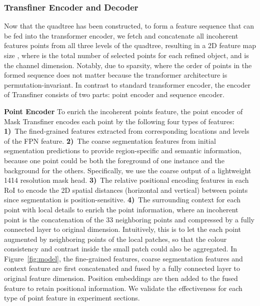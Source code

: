 \documentclass[10pt,twocolumn,letterpaper]{article}
\newcommand{\parsection}[1]{\vspace{1mm}\noindent\textbf{#1}}
\begin{document}
\subsubsection{Transfiner Encoder and Decoder} 
Now that the quadtree has been constructed, to form a feature sequence that can be fed into the transformer encoder, we fetch and concatenate all incoherent features points from all three levels of the quadtree, resulting in a 2D feature map size , where  is the total number of selected points for each refined object, and  is the channel dimension. Notably,  due to  sparsity, where the order of points in the formed sequence does not matter because the transformer architecture is permutation-invariant. In contrast to standard transformer encoder, the encoder of Transfiner consists of two parts: point encoder and sequence encoder.

\parsection{Point Encoder} 
To enrich the incoherent points feature, the point encoder of Mask Transfiner encodes each point by the following four types of features: \textbf{1)}~The fined-grained features extracted from corresponding locations and levels of the FPN feature. \textbf{2)}~The coarse segmentation features from initial segmentation predictions to provide region-specific and semantic information, because one point could be both the foreground of one instance and the background for the others. Specifically, we use the coarse output of a lightweight 1414 resolution mask head. \textbf{3)}~The relative positional encoding features in each RoI to encode the 2D spatial distances (horizontal and vertical) between points since segmentation is position-sensitive. \textbf{4)}~The surrounding context for each point with local details to enrich the point information, where an incoherent point is the concatenation of the 33 neighboring points and compressed by a fully connected layer to original dimension. Intuitively, this is to let the each point augmented by neighboring points of the local patches, so that the colour consistency and contrast inside the small patch could also be aggregated. In Figure~\ref{fig:model}, the fine-grained features, coarse segmentation features and context feature are first concatenated and fused by a fully connected layer to original feature dimension. Position embeddings are then added to the fused feature to retain positional information. We validate the effectiveness for each type of point feature in experiment sections. 
\end{document}
